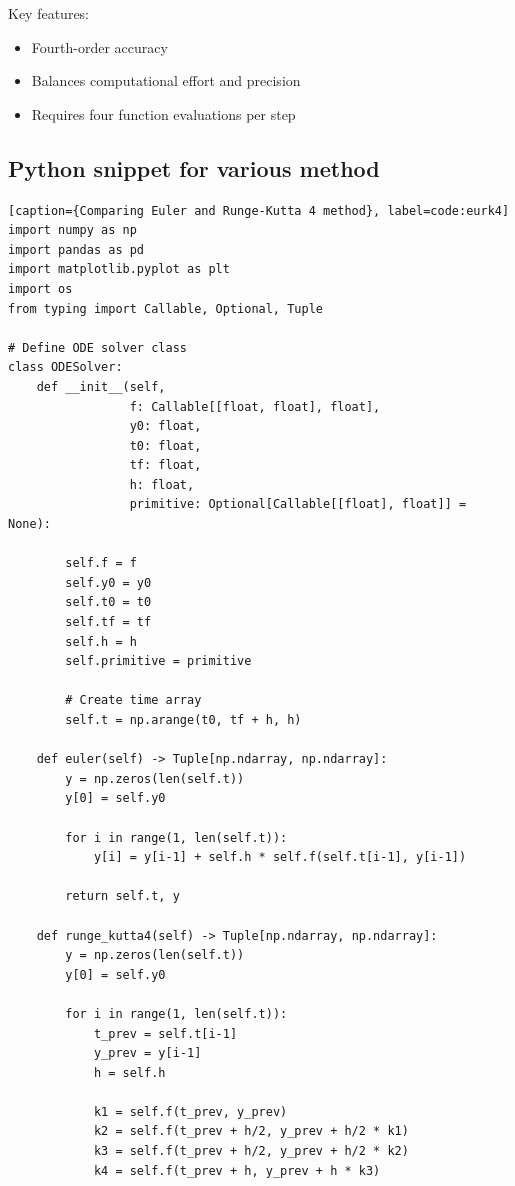 \documentclass[10pt]{article}
\begin{document}
Key features:
\begin{itemize}
    \item Fourth-order accuracy
    \item Balances computational effort and precision
    \item Requires four function evaluations per step
\end{itemize}





\subsection{Python snippet for various method}

\begin{lstlisting}[style=custompython][caption={Comparing Euler and Runge-Kutta 4 method}, label=code:eurk4]
import numpy as np
import pandas as pd
import matplotlib.pyplot as plt
import os
from typing import Callable, Optional, Tuple

# Define ODE solver class
class ODESolver:
    def __init__(self, 
                 f: Callable[[float, float], float], 
                 y0: float, 
                 t0: float, 
                 tf: float, 
                 h: float,
                 primitive: Optional[Callable[[float], float]] = None):

        self.f = f
        self.y0 = y0
        self.t0 = t0
        self.tf = tf
        self.h = h
        self.primitive = primitive
        
        # Create time array
        self.t = np.arange(t0, tf + h, h)
        
    def euler(self) -> Tuple[np.ndarray, np.ndarray]:
        y = np.zeros(len(self.t))
        y[0] = self.y0
        
        for i in range(1, len(self.t)):
            y[i] = y[i-1] + self.h * self.f(self.t[i-1], y[i-1])
            
        return self.t, y
    
    def runge_kutta4(self) -> Tuple[np.ndarray, np.ndarray]:
        y = np.zeros(len(self.t))
        y[0] = self.y0
        
        for i in range(1, len(self.t)):
            t_prev = self.t[i-1]
            y_prev = y[i-1]
            h = self.h
            
            k1 = self.f(t_prev, y_prev)
            k2 = self.f(t_prev + h/2, y_prev + h/2 * k1)
            k3 = self.f(t_prev + h/2, y_prev + h/2 * k2)
            k4 = self.f(t_prev + h, y_prev + h * k3)
            

\end{lstlisting}
\end{document}
